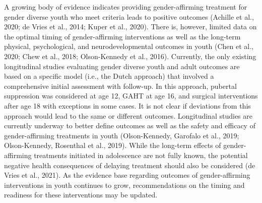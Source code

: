 \documentclass[
]{book}
\begin{document}
A growing body of evidence indicates providing gender-affirming treatment for gender diverse
youth who meet criteria leads to positive outcomes (Achille et al., 2020; de Vries et al., 2014;
Kuper et al., 2020). There is, however, limited
data on the optimal timing of gender-affirming
interventions as well as the long-term physical,
psychological, and neurodevelopmental outcomes
in youth (Chen et al., 2020; Chew et al., 2018;
Olson-Kennedy et al., 2016). Currently, the only
existing longitudinal studies evaluating gender
diverse youth and adult outcomes are based on
a specific model (i.e., the Dutch approach) that
involved a comprehensive initial assessment with
follow-up. In this approach, pubertal suppression
was considered at age 12, GAHT at age 16, and
surgical interventions after age 18 with exceptions
in some cases. It is not clear if deviations from
this approach would lead to the same or different
outcomes. Longitudinal studies are currently
underway to better define outcomes as well as
the safety and efficacy of gender-affirming treatments in youth (Olson-Kennedy, Garofalo et al.,
2019; Olson-Kennedy, Rosenthal et al., 2019).
While the long-term effects of gender-affirming
treatments initiated in adolescence are not fully
known, the potential negative health consequences
of delaying treatment should also be considered
(de Vries et al., 2021). As the evidence base
regarding outcomes of gender-affirming interventions in youth continues to grow, recommendations on the timing and readiness for these
interventions may be updated.
\end{document}
